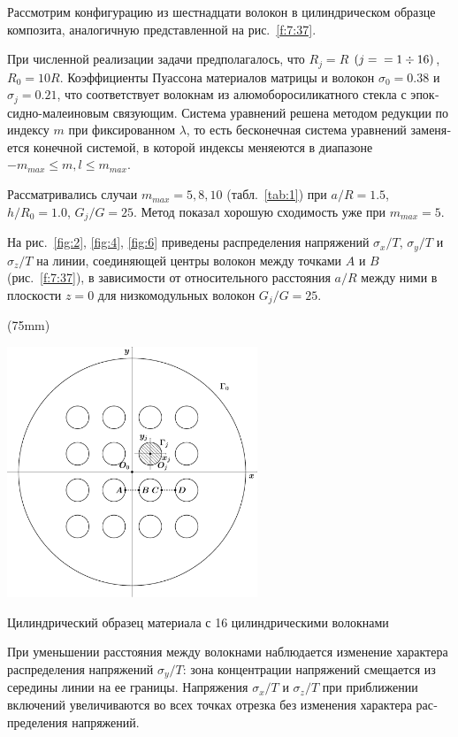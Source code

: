 \begin{russian}
Рассмотрим конфигурацию из шестнадцати волокон в цилиндрическом образце композита, аналогичную представленной на рис.~\ref{f:7:37}.

При численной реализации задачи предполагалось, что $R_j=R$ $(j=\\=1\div 16)$, $R_0=10R$. Коэффициенты Пуассона материалов матрицы и волокон $\sigma_0=0.38$ и $\sigma_j=0.21$, что соответствует волокнам из алюмоборосиликатного стекла с эпоксидно-малеиновым связующим. Система уравнений решена методом редукции по индексу $m$ при фиксированном $\lambda$, то есть бесконечная система уравнений заменяется конечной системой, в которой индексы меняеются в диапазоне $-m_{max}\le m,l\le m_{max}$.\par\sloppy

Рассматривались случаи $m_{max}=5,8,10$ (табл.~\ref{tab:1}) при $a/R=1.5$, $h/R_0=1.0$, $G_j/G=25$. Метод показал хорошую сходимость уже при $m_{max}=5$.

На рис.~\ref{fig:2}, \ref{fig:4}, \ref{fig:6} приведены распределения напряжений $\sigma_x/T$, $\sigma_y/T$ и $\sigma_z/T$ на линии, соединяющей центры волокон между точками $A$ и $B$ (рис.~\ref{f:7:37}), в зависимости от относительного расстояния $a/R$ между ними в плоскости $z=0$ для низкомодульных волокон $G_j/G=25$.\sloppy

\sidefig*(75mm){
\includegraphics[width=7.5cm]{inc-16.pdf}
\caption{Цилиндрический образец материала с 16 цилиндрическими волокнами}
\label{f:7:37}
}{
При уменьшении расстояния между волокнами наблюдается изменение характера распределения напряжений $\sigma_y/T$: зона концентрации напряжений смещается из середины линии на ее границы. Напряжения $\sigma_x/T$ и $\sigma_z/T$ при приближении включений увеличиваются во всех точках отрезка без изменения характера распределения напряжений.\sloppy

}
\end{russian}
